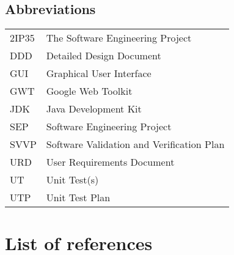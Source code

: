 \subsection{Abbreviations}
\begin{tabular}{l|l}
2IP35 & The Software Engineering Project \\
DDD & Detailed Design Document \\
GUI & Graphical User Interface \\
GWT   & Google Web Toolkit \\
JDK   & Java Development Kit \\
SEP   & Software Engineering Project \\
SVVP & Software Validation and Verification Plan \\
URD   & User Requirements Document \\
UT    & Unit Test(s) \\
UTP & Unit Test Plan \\
\end{tabular}

\section{List of references}

